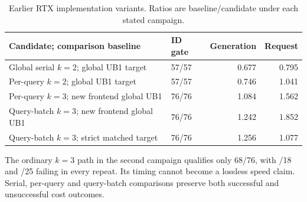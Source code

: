 \begin{table}[ht]\centering\small
\caption{Earlier RTX implementation variants. Ratios are baseline/candidate under each stated campaign.}
\label{tab:implementation_history}
\begin{tabularx}{\linewidth}{@{}Xlrr@{}}\toprule
Candidate; comparison baseline & ID gate & Generation & Request\\\midrule
Global serial $k=2$; global UB1 target & 57/57 & 0.677 & 0.795\\
Per-query $k=2$; global UB1 target & 57/57 & 0.746 & 1.041\\
Per-query $k=3$; new frontend global UB1 & 76/76 & 1.084 & 1.562\\
Query-batch $k=3$; new frontend global UB1 & 76/76 & 1.242 & 1.852\\
Query-batch $k=3$; strict matched target & 76/76 & 1.256 & 1.077\\\bottomrule
\end{tabularx}
\end{table}

The ordinary $k=3$ path in the second campaign qualifies only 68/76, with /18 and /25 failing in every repeat. Its timing cannot become a lossless speed claim. Serial, per-query and query-batch comparisons preserve both successful and unsuccessful cost outcomes.
